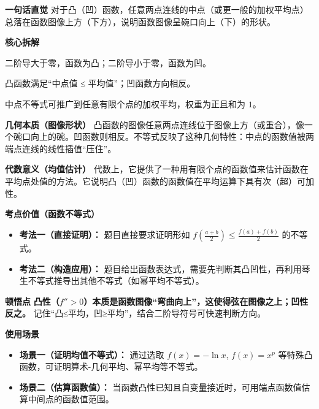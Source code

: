 \begin{explanationbox}
\textbf{\textcolor{CExplanation}{一句话直觉}}
对于凸（凹）函数，任意两点连线的中点（或更一般的加权平均点）总落在函数图像上方（下方），说明函数图像呈碗口向上（下）的形状。

\medskip
\textbf{\textcolor{CExplanation}{核心拆解}}
\begin{description}[style=nextline, leftmargin=2.8em, labelsep=0.5em, itemsep=0.45em]
    \item[\textbf{要点一（二阶导判凸凹）：}] 二阶导大于零，函数为凸；二阶导小于零，函数为凹。
    \item[\textbf{要点二（中点不等式）：}] 凸函数满足“中点值 ≤ 平均值”；凹函数方向相反。
    \item[\textbf{要点三（加权推广）：}] 中点不等式可推广到任意有限个点的加权平均，权重为正且和为 $1$。
\end{description}

\medskip
\textbf{\textcolor{CExplanation}{几何本质（图像形状）}}
凸函数的图像任意两点连线位于图像上方（或重合），像一个碗口向上的碗。凹函数则相反。不等式反映了这种几何特性：中点的函数值被两端点连线的线性插值“压住”。

\medskip
\textbf{\textcolor{CExplanation}{代数意义（均值估计）}}
代数上，它提供了一种用有限个点的函数值来估计函数在平均点处值的方法。它说明凸（凹）函数的函数值在平均运算下具有次（超）可加性。

\medskip
\textbf{\textcolor{CExplanation}{考点价值（函数不等式）}}
\begin{itemize}[leftmargin=*, itemsep=0.5em, topsep=0.4em]
    \item \textbf{考法一（直接证明）：} 题目直接要求证明形如 $f(\frac{a+b}{2}) \le \frac{f(a)+f(b)}{2}$ 的不等式。
    \item \textbf{考法二（构造应用）：} 题目给出函数表达式，需要先判断其凸凹性，再利用琴生不等式推导出其他不等式（如幂平均不等式）。
\end{itemize}

\medskip
\textbf{\textcolor{CExplanation}{顿悟点}}
\textbf{凸性（$f''>0$）本质是函数图像“弯曲向上”，这使得弦在图像之上；凹性反之。} 记住“凸≤平均，凹≥平均”，结合二阶导符号可快速判断方向。

\medskip
\textbf{\textcolor{CExplanation}{使用场景}}
\begin{itemize}[leftmargin=*, itemsep=0.5em, topsep=0.4em]
    \item \textbf{场景一（证明均值不等式）：} 通过选取 $f(x)=-\ln x$, $f(x)=x^p$ 等特殊凸函数，可证明算术-几何平均、幂平均等不等式。
    \item \textbf{场景二（估算函数值）：} 当函数凸性已知且自变量接近时，可用端点函数值估算中间点的函数值范围。
\end{itemize}
\end{explanationbox}
